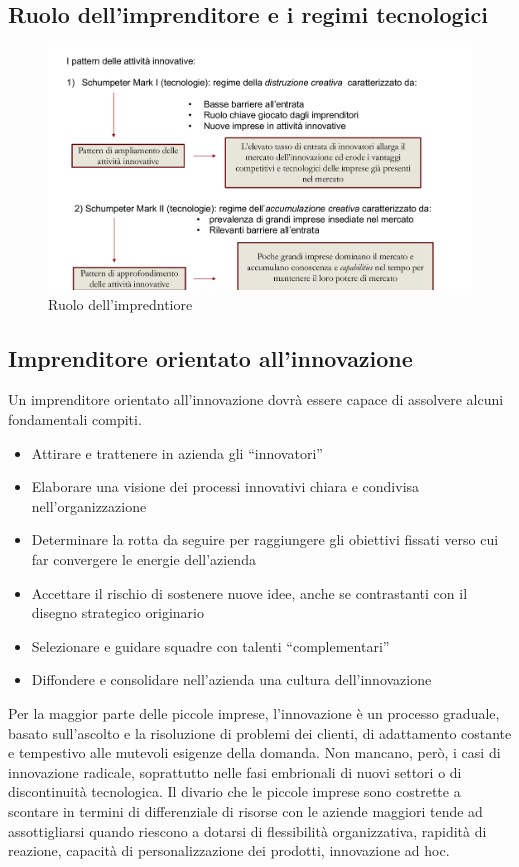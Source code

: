 \documentclass{article}
\begin{document}
\subsection{Ruolo dell'imprenditore e i regimi tecnologici}


\begin{figure}[h!]
	\centering
	\includegraphics[scale=0.3]{images/ruoloimp.png}
	\caption{Ruolo dell'impredntiore}
	\label{fig:imp}
\end{figure} 

\subsection{Imprenditore orientato all'innovazione}
Un imprenditore orientato all’innovazione dovrà essere capace di
assolvere alcuni fondamentali compiti.
\begin{itemize}
	\item Attirare e trattenere in azienda gli “innovatori”
	\item Elaborare una visione dei processi innovativi chiara e condivisa
	nell’organizzazione
	\item Determinare la rotta da seguire per raggiungere gli obiettivi fissati verso cui far
	convergere le energie dell’azienda
	\item Accettare il rischio di sostenere nuove idee, anche se contrastanti con il
	disegno strategico originario
	\item Selezionare e guidare squadre con talenti “complementari”
	\item Diffondere e consolidare nell’azienda una cultura dell’innovazione
\end{itemize}


Per la maggior parte delle piccole imprese, l’innovazione è un processo
graduale, basato sull’ascolto e la risoluzione di problemi dei clienti, di
adattamento costante e tempestivo alle mutevoli esigenze della domanda.
Non mancano, però, i casi di innovazione radicale, soprattutto nelle fasi
embrionali di nuovi settori o di discontinuità tecnologica.
Il divario che le piccole imprese sono costrette a scontare in termini di
differenziale di risorse con le aziende maggiori tende ad assottigliarsi quando
riescono a dotarsi di flessibilità organizzativa, rapidità di reazione, capacità di
personalizzazione dei prodotti, innovazione ad hoc.
\end{document}
